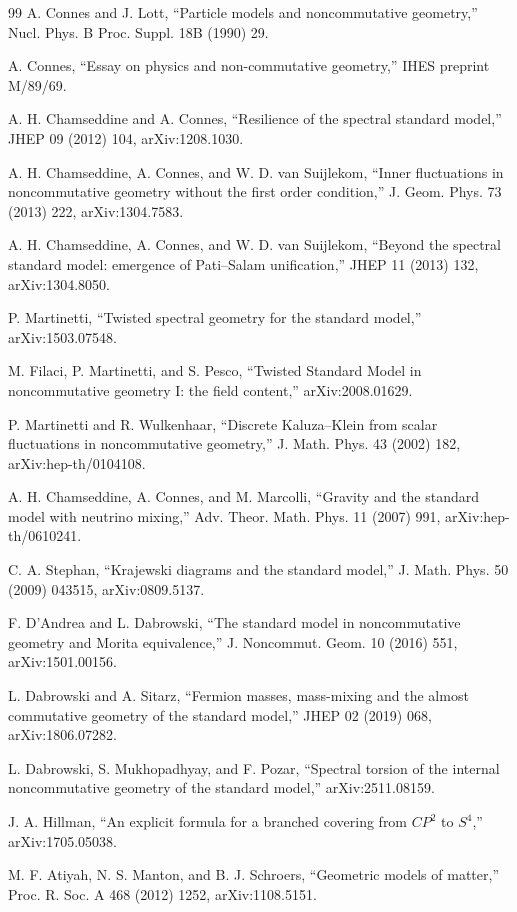 \documentclass[11pt]{article}
\theoremstyle{definition}
\theoremstyle{remark}
\begin{document}
\begin{thebibliography}{99}
A. Connes and J. Lott,
``Particle models and noncommutative geometry,''
Nucl. Phys. B Proc. Suppl. 18B (1990) 29.

A. Connes,
``Essay on physics and non-commutative geometry,''
IHES preprint M/89/69.

A. H. Chamseddine and A. Connes,
``Resilience of the spectral standard model,''
JHEP 09 (2012) 104, arXiv:1208.1030.

A. H. Chamseddine, A. Connes, and W. D. van Suijlekom,
``Inner fluctuations in noncommutative geometry without the first order
condition,''
J. Geom. Phys. 73 (2013) 222, arXiv:1304.7583.

A. H. Chamseddine, A. Connes, and W. D. van Suijlekom,
``Beyond the spectral standard model: emergence of Pati--Salam unification,''
JHEP 11 (2013) 132, arXiv:1304.8050.

P. Martinetti,
``Twisted spectral geometry for the standard model,''
arXiv:1503.07548.

M. Filaci, P. Martinetti, and S. Pesco,
``Twisted Standard Model in noncommutative geometry I: the field content,''
arXiv:2008.01629.

P. Martinetti and R. Wulkenhaar,
``Discrete Kaluza--Klein from scalar fluctuations in noncommutative
geometry,''
J. Math. Phys. 43 (2002) 182, arXiv:hep-th/0104108.

A. H. Chamseddine, A. Connes, and M. Marcolli,
``Gravity and the standard model with neutrino mixing,''
Adv. Theor. Math. Phys. 11 (2007) 991, arXiv:hep-th/0610241.

C. A. Stephan,
``Krajewski diagrams and the standard model,''
J. Math. Phys. 50 (2009) 043515, arXiv:0809.5137.

F. D'Andrea and L. Dabrowski,
``The standard model in noncommutative geometry and Morita equivalence,''
J. Noncommut. Geom. 10 (2016) 551, arXiv:1501.00156.

L. Dabrowski and A. Sitarz,
``Fermion masses, mass-mixing and the almost commutative geometry of the
standard model,''
JHEP 02 (2019) 068, arXiv:1806.07282.

L. Dabrowski, S. Mukhopadhyay, and F. Pozar,
``Spectral torsion of the internal noncommutative geometry of the standard
model,''
arXiv:2511.08159.

J. A. Hillman,
``An explicit formula for a branched covering from \(CP^2\) to \(S^4\),''
arXiv:1705.05038.

M. F. Atiyah, N. S. Manton, and B. J. Schroers,
``Geometric models of matter,''
Proc. R. Soc. A 468 (2012) 1252, arXiv:1108.5151.

\end{thebibliography}
\endgroup
\end{document}
